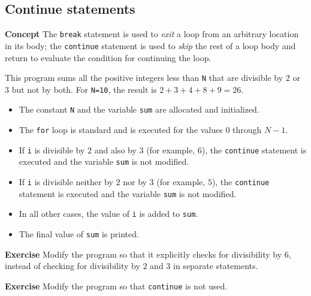 \subsection{Continue statements}\label{control.08}

\textbf{Concept} The \texttt{break} statement is used to \emph{exit} a loop
from an arbitrary location in its body; the \texttt{continue} statement is used
to \emph{skip} the rest of a loop body and return to evaluate the condition
for continuing the loop.


This program sums all the positive integers less than \texttt{N} that are
divisible by $2$ or $3$ but not by both. For \texttt{N=10}, the result
is $2+3+4+8+9=26$.
\begin{itemize}
\item The constant \texttt{N} and the variable \texttt{sum} are allocated and initialized.
\item The \texttt{for} loop is standard and is executed for the values $0$ through $N-1$.
\item If \texttt{i} is divisible by $2$ and also by $3$ (for example, $6$), the 
\texttt{continue} statement is executed and the variable \texttt{sum} is not modified.
\item If \texttt{i} is divisible neither by $2$ nor by $3$ (for example, $5$), the 
\texttt{continue} statement is executed and the variable \texttt{sum} is not modified.
\item In all other cases, the value of \texttt{i} is added to \texttt{sum}.
\item The final value of \texttt{sum} is printed. 
\end{itemize}

\textbf{Exercise} Modify the program so that it explicitly checks for
divisibility by $6$, instead of checking for divisibility by $2$ and $3$ in
separate statements.

\textbf{Exercise} Modify the program so that \texttt{continue} is not used.

